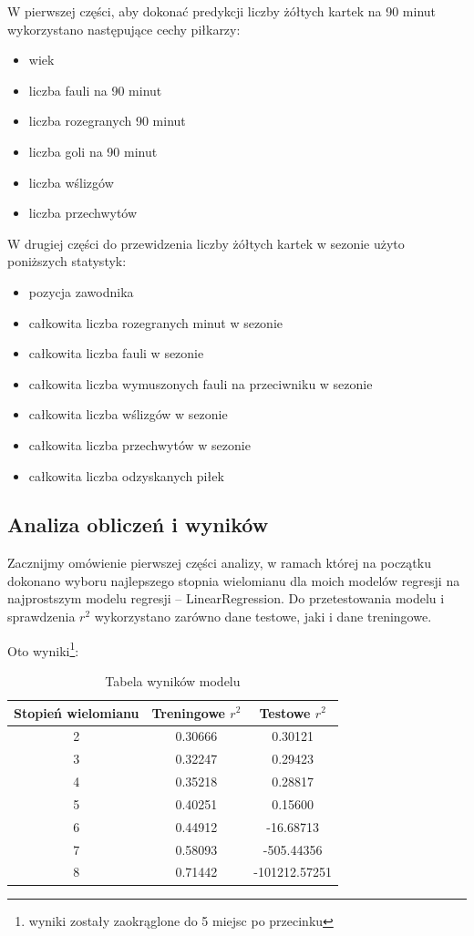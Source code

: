 \documentclass{article}
\begin{document}
W pierwszej części, aby dokonać predykcji liczby żółtych kartek na 90 minut wykorzystano następujące cechy piłkarzy:

\begin{itemize}
  \item wiek
  \item liczba fauli na 90 minut
  \item liczba rozegranych 90 minut
  \item liczba goli na 90 minut
  \item liczba wślizgów
  \item liczba przechwytów
\end{itemize}

\noindent W drugiej części do przewidzenia liczby żółtych kartek w sezonie użyto poniższych statystyk:

\begin{itemize}
  \item pozycja zawodnika
  \item całkowita liczba rozegranych minut w sezonie
  \item całkowita liczba fauli w sezonie
  \item całkowita liczba wymuszonych fauli na przeciwniku w sezonie
  \item całkowita liczba wślizgów w sezonie
  \item całkowita liczba przechwytów w sezonie
  \item całkowita liczba odzyskanych piłek
\end{itemize}

\subsection{Analiza obliczeń i wyników}

Zacznijmy omówienie pierwszej części analizy, w ramach której na początku dokonano wyboru najlepszego stopnia wielomianu dla moich modelów regresji na najprostszym modelu regresji – LinearRegression. Do przetestowania modelu i sprawdzenia $r^2$ wykorzystano zarówno dane testowe, jaki i dane treningowe. 

Oto wyniki\footnote{wyniki zostały zaokrąglone do 5 miejsc po przecinku}:

\begin{table}[H]
\centering
\begin{tabular}{|c|c|c|}
\hline
Stopień wielomianu & Treningowe $r^2$ & Testowe $r^2$ \\
\hline
2 & 0.30666 & 0.30121 \\ \hline
3 & 0.32247 & 0.29423 \\ \hline
4 & 0.35218 & 0.28817 \\ \hline
5 & 0.40251 & 0.15600 \\ \hline
6 & 0.44912 & -16.68713 \\ \hline
7 & 0.58093 & -505.44356 \\ \hline
8 & 0.71442 & -101212.57251 \\ 
\hline
\end{tabular}
\caption{Tabela wyników modelu}
\end{table}
\end{document}
